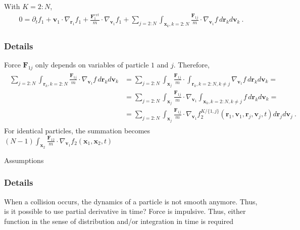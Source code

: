 \documentclass[letterpaper,10pt,english]{jupyterBook}
\begin{document}
\sphinxAtStartPar
{} With \(K = 2:N\),
\begin{equation*}
\begin{split}
  0 = \partial_t f_1 + \mathbf{v}_1 \cdot \nabla_{\mathbf{r}_1} f_1 + \frac{\mathbf{F}^{ext}_1}{m} \cdot \nabla_{\mathbf{v}_1} f_1 + \sum_{j = 2:N} \int_{\mathbf{x}_k, k = 2:N} \frac{\mathbf{F}_{1j}}{m} \cdot \nabla_{\mathbf{v}_1} f \, d \mathbf{r}_k d \mathbf{v}_k \ .
\end{split}
\end{equation*}\subsubsection*{Details}

\sphinxAtStartPar
Force \(\mathbf{F}_{1j}\) only depends on variables of particle \(1\) and \(j\). Therefore,
\begin{equation*}
\begin{split}\begin{aligned}
  \sum_{j = 2:N} \int_{\mathbf{r}_k, k = 2:N} \frac{\mathbf{F}_{1j}}{m} \cdot \nabla_{\mathbf{v}_1} f \, d \mathbf{r}_k d \mathbf{v}_k 
  & = \sum_{j = 2:N} \int_{\mathbf{x}_j} \frac{\mathbf{F}_{1j}}{m} \cdot  \int_{\mathbf{r}_k, k = 2:N, k \ne j} \nabla_{\mathbf{v}_1} f \, d \mathbf{r}_k d \mathbf{v}_k = \\
  & = \sum_{j = 2:N} \int_{\mathbf{x}_j} \frac{\mathbf{F}_{1j}}{m} \cdot  \nabla_{\mathbf{v}_1} \int_{\mathbf{x}_k, k = 2:N, k \ne j} f \, d \mathbf{r}_k d \mathbf{v}_k = \\
  & = \sum_{j = 2:N} \int_{\mathbf{x}_j} \frac{\mathbf{F}_{1j}}{m} \cdot  \nabla_{\mathbf{v}_1} f_2^{K/\{1, j\}} (\mathbf{r}_1, \mathbf{v}_1, \mathbf{r}_j, \mathbf{v}_j, t) d \mathbf{r}_j d \mathbf{v}_j \ .
\end{aligned}\end{split}
\end{equation*}
\sphinxAtStartPar
For identical particles, the summation becomes \((N-1) \int_{\mathbf{x}_2} \frac{\mathbf{F}_{12}}{m} \cdot \nabla_{\mathbf{v}_1} f_2(\mathbf{x}_1, \mathbf{x}_2,t)\)

\sphinxAtStartPar
{} Assumptions
\subsubsection*{Details}

\sphinxAtStartPar
When a collision occurs, the dynamics of a particle is not smooth anymore. Thus, is it possible to use partial derivative in time? Force is impulsive. Thus, either function in the sense of distribution and/or integration in time is required
\end{document}
